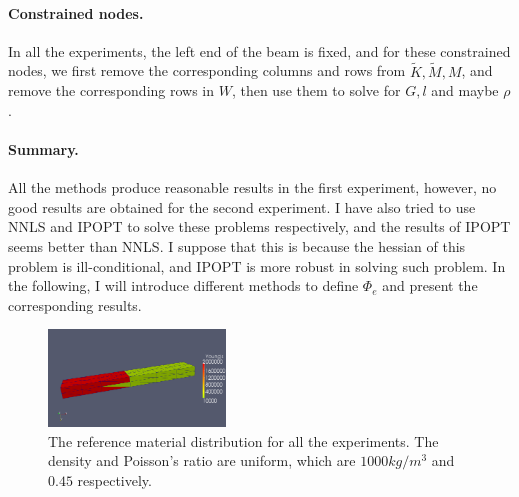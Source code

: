 \documentclass[9pt,twocolumn]{extarticle}
\begin{document}
\paragraph{Constrained nodes.}
In all the experiments, the left end of the beam is fixed, and for these
constrained nodes, we first remove the corresponding columns and rows from
$\tilde{K}, \tilde{M}, M$, and remove the corresponding rows in $W$, then use
them to solve for $G,l$ and maybe $\rho$.

\paragraph{Summary.}
All the methods produce reasonable results in the first experiment, however,
no good results are obtained for the second experiment. I have also tried to
use NNLS and IPOPT to solve these problems respectively, and the results of
IPOPT seems better than NNLS. I suppose that this is because the hessian of this
problem is ill-conditional, and IPOPT is more robust in solving such problem. In
the following, I will introduce different methods to define $\Phi_e$ and present
the corresponding results.

\begin{figure}
  \centering
  \includegraphics[width=0.42\textwidth]{./figures/ref_E.png}
  \caption{The reference material distribution for all the experiments. The
    density and Poisson's ratio are uniform, which are $1000 kg/m^3$ and $0.45$
    respectively.}
  \label{ref_E} 
\end{figure}
\end{document}
